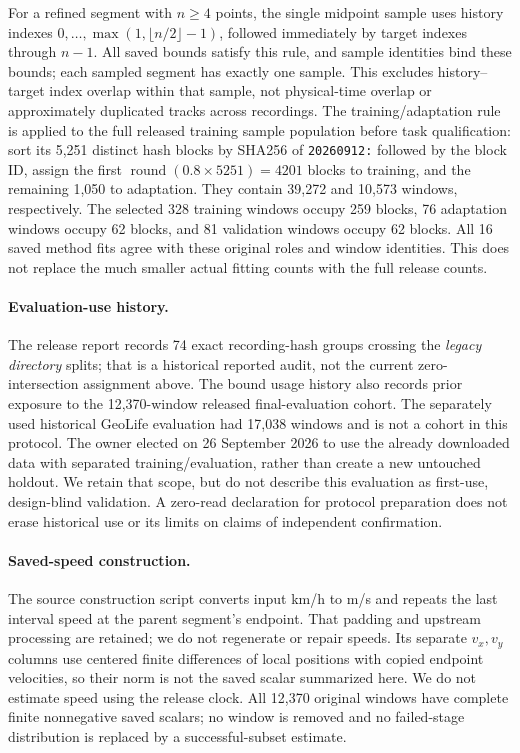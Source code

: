 \documentclass[11pt]{article}
\begin{document}
For a refined segment with \(n\geq4\) points, the single midpoint sample uses
history indexes \(0,\ldots,\max(1,\lfloor n/2\rfloor-1)\), followed immediately
by target indexes through \(n-1\). All saved bounds satisfy this rule, and
sample identities bind these bounds; each sampled segment has exactly one
sample. This excludes history--target index overlap within that sample, not
physical-time overlap or approximately duplicated tracks across recordings.
The training/adaptation rule is applied to the full released training
sample population before task qualification: sort its 5,251 distinct hash
blocks by SHA256 of \texttt{20260912:} followed by the block ID, assign the
first \(\operatorname{round}(0.8\times5251)=4201\) blocks to training, and the
remaining 1,050 to adaptation. They contain 39,272 and 10,573 windows,
respectively. The selected 328 training windows occupy 259 blocks, 76
adaptation windows occupy 62 blocks, and 81 validation windows occupy 62
blocks. All 16 saved method fits agree with these original roles and window
identities. This does not replace the much smaller actual fitting counts
with the full release counts.

\paragraph{Evaluation-use history.}
The release report records 74 exact recording-hash groups crossing the
\emph{legacy directory} splits; that is a historical reported audit, not the
current zero-intersection assignment above. The bound usage history also
records prior exposure to the 12,370-window released final-evaluation cohort.
The separately used historical GeoLife evaluation had 17,038 windows and is
not a cohort in this protocol. The owner elected on 26 September 2026 to use
the already downloaded data with separated training/evaluation, rather than
create a new untouched holdout. We retain that scope, but do not describe
this evaluation as first-use, design-blind validation. A zero-read declaration
for protocol preparation does not erase historical use or its limits on
claims of independent confirmation.

\paragraph{Saved-speed construction.}
The source construction script converts input km/h to m/s and repeats
the last interval speed at the parent segment's endpoint. That padding and
upstream processing are retained; we do not regenerate or repair speeds.
Its separate \(v_x,v_y\) columns use centered finite differences of local
positions with copied endpoint velocities, so their norm is not the
saved scalar summarized here. We do not estimate speed using the release clock.
All 12,370 original windows have complete finite nonnegative saved
scalars; no window is removed and no failed-stage distribution is replaced
by a successful-subset estimate.
\end{document}
